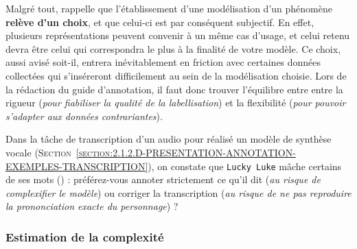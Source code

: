			Malgré tout, \cite{baledent:2022:complexite-annotation-manuelle} rappelle que l'établissement d'une modélisation d'un phénomène \textbf{relève d'un choix}, et que celui-ci est par conséquent subjectif.
			En effet, plusieurs représentations peuvent convenir à un même cas d'usage, et celui retenu devra être celui qui correspondra le plus à la finalité de votre modèle.
			Ce choix, aussi avisé soit-il, entrera inévitablement en friction avec certaines données collectées qui s'inséreront difficilement au sein de la modélisation choisie.
			Lors de la rédaction du guide d'annotation, il faut donc trouver l'équilibre entre entre la rigueur (\textit{pour fiabiliser la qualité de la labellisation}) et la flexibilité (\textit{pour pouvoir s'adapter aux données contrariantes}).
			\begin{leftBarExamples}
				Dans la tâche de transcription d'un audio pour réalisé un modèle de synthèse vocale (\textsc{Section~\ref{section:2.1.2.D-PRESENTATION-ANNOTATION-EXEMPLES-TRANSCRIPTION}}), on constate que \texttt{Lucky Luke} mâche certains de ses mots () : préférez-vous annoter strictement ce qu'il dit (\textit{au risque de complexifier le modèle}) ou corriger la transcription (\textit{au risque de ne pas reproduire la prononciation exacte du personnage}) ?
			\end{leftBarExamples}
		
		\subsubsection{Estimation de la complexité}
		\label{section:2.3.2.B-DEFIS-ANNOTATION-ASPECT-COMPLEXITE-ESTIMATION}
			
